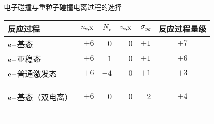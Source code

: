 \begin{frame}{电子碰撞与重粒子碰撞电离过程的选择}
\centering
\begin{table}%
\begin{center}
\begin{tabular}{lrrrrc}\toprule[1.5pt]
反应过程 & $n_{\rm e,X}$ & $N_{p}$ & $v_{\rm e,X}$ & $\sigma_{pq}$ & 反应过程量级\\
\midrule[1pt]
${\rm e-}$基态       & $+6$ & $0$  & $0$  & $+1$ & $+7$ \\
${\rm e-}$亚稳态     & $+6$ & $-1$ & $0$  & $+1$ & $+6$ \\
${\rm e-}$普通激发态 & $+6$ & $-4$ & $0$  & $+1$ & $+3$ \\
\color{gray}{${\rm X-}$基态}       & \color{gray}{$+4$} & \color{gray}{$0$}  & \color{gray}{$-3$} & \color{gray}{$-3$} & \color{gray}{$-2$} \\
\color{gray}{${\rm X-}$亚稳态}     & \color{gray}{$+4$} & \color{gray}{$-1$} & \color{gray}{$-3$} & \color{gray}{$-3$} & \color{gray}{$-3$} \\
\color{gray}{${\rm X-}$普通激发态} & \color{gray}{$+4$} & \color{gray}{$-4$} & \color{gray}{$-3$} & \color{gray}{$-3$} & \color{gray}{$-6$} \\
${\rm e-}$基态（双电离）       & $+6$ & $0$  & $0$  & $-2$  & $+4$ \\
\color{gray}{${\rm e-}$亚稳态（双电离）}     & \color{gray}{$+6$} & \color{gray}{$-1$} & \color{gray}{$0$}  & \color{gray}{$-2$}  & \color{gray}{$+3$} \\
\color{gray}{${\rm e-}$普通激发态（双电离）} & \color{gray}{$+6$} & \color{gray}{$-4$} & \color{gray}{$0$}  & \color{gray}{$-2$}  & \hspace{0.8em}\color{gray}{$0$} \\
\color{gray}{${\rm X-}$基态（双电离）}       & \color{gray}{$+4$} & \color{gray}{$0$}  & \color{gray}{$-3$} & \color{gray}{$-3$} & \color{gray}{$-2$} \\
\color{gray}{${\rm X-}$亚稳态（双电离）}     & \color{gray}{$+4$} & \color{gray}{$-1$} & \color{gray}{$-3$} & \color{gray}{$-3$} & \color{gray}{$-3$} \\
\color{gray}{${\rm X-}$普通激发态（双电离）} & \color{gray}{$+4$} & \color{gray}{$-4$} & \color{gray}{$-3$} & \color{gray}{$-3$} & \color{gray}{$-6$} \\
\bottomrule[1.5pt]
\end{tabular}
\end{center}
\end{table}
\end{frame}


